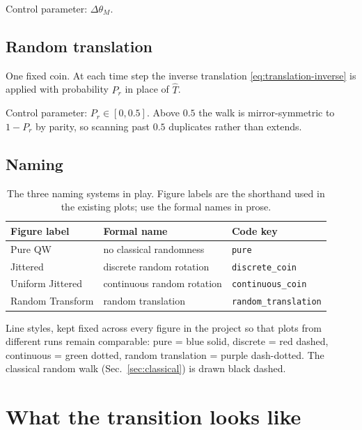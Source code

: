 \documentclass[11pt]{article}
\newcommand{\dthetaM}{\Delta\theta_{M}}             %
\newcommand{\Prand}{P_{r}}                          %
\newcommand{\Top}{\hat{T}}                          %
\begin{document}
\noindent Control parameter: $\dthetaM$.

\subsection{Random translation}
\label{sec:ch-translation}
One fixed coin. At each time step the inverse translation
\eqref{eq:translation-inverse} is applied with probability $\Prand$ in place
of $\Top$.

\noindent Control parameter: $\Prand \in [0,0.5]$. Above $0.5$ the walk is
mirror-symmetric to $1-\Prand$ by parity, so scanning past $0.5$ duplicates
rather than extends.

\subsection{Naming}
\label{sec:ch-naming}

\begin{table}[h]
\centering
\begin{tabular}{lll}
\toprule
\textbf{Figure label} & \textbf{Formal name} & \textbf{Code key} \\
\midrule
Pure QW          & no classical randomness      & \texttt{pure} \\
Jittered         & discrete random rotation     & \texttt{discrete\_coin} \\
Uniform Jittered & continuous random rotation   & \texttt{continuous\_coin} \\
Random Transform & random translation           & \texttt{random\_translation} \\
\bottomrule
\end{tabular}
\caption{The three naming systems in play. Figure labels are the shorthand
used in the existing plots; use the formal names in prose.}
\label{tab:naming}
\end{table}

\noindent
Line styles, kept fixed across every figure in the project so that plots from
different runs remain comparable: pure = blue solid, discrete = red dashed,
continuous = green dotted, random translation = purple dash-dotted. The
classical random walk (Sec.~\ref{sec:classical}) is drawn black dashed.

\section{What the transition looks like}
\label{sec:phenomenology}
\end{document}
